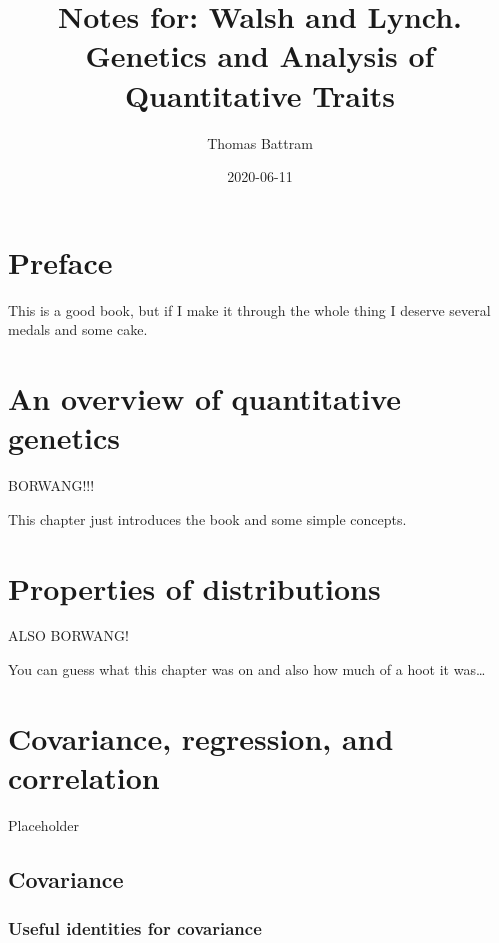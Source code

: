 \documentclass[
]{book}
\title{Notes for: Walsh and Lynch. Genetics and Analysis of Quantitative Traits}
\author{Thomas Battram}
\date{2020-06-11}
\begin{document}
\maketitle

{
\setcounter{tocdepth}{1}
\tableofcontents
}
\hypertarget{preface}{%
\chapter*{Preface}\label{preface}}

This is a good book, but if I make it through the whole thing I deserve several medals and some cake.

\hypertarget{an-overview-of-quantitative-genetics}{%
\chapter{An overview of quantitative genetics}\label{an-overview-of-quantitative-genetics}}

BORWANG!!!

This chapter just introduces the book and some simple concepts.

\hypertarget{properties-of-distributions}{%
\chapter{Properties of distributions}\label{properties-of-distributions}}

ALSO BORWANG!

You can guess what this chapter was on and also how much of a hoot it was\ldots{}

\hypertarget{covariance-regression-and-correlation}{%
\chapter{Covariance, regression, and correlation}\label{covariance-regression-and-correlation}}

Placeholder

\hypertarget{covariance}{%
\section{Covariance}\label{covariance}}

\hypertarget{useful-identities-for-covariance}{%
\subsection{Useful identities for covariance}\label{useful-identities-for-covariance}}
\end{document}
